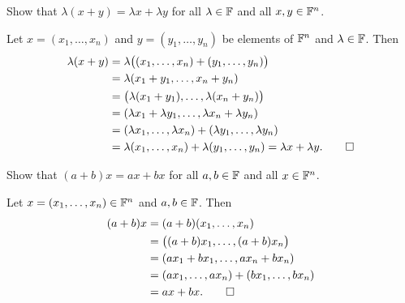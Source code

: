 \begin{exc}
\begin{exercise}
Show that $\lambda(x+y)=\lambda x+\lambda y$ for all $\lambda\in\mathbb{F}$ and all
$x,y\in\mathbb{F}^n$.
\end{exercise}
\begin{solution}
Let $x=(x_1,\dots,x_n)$ and $y=(y_1,\dots,y_n)$ be elements of $\mathbb{F}^n$ and
$\lambda\in\mathbb{F}$. Then
\begin{align*}
\lambda(x+y) &= \lambda\bigl((x_1,\dots,x_n)+(y_1,\dots,y_n)\bigr)\\
  &= \lambda(x_1+y_1,\dots,x_n+y_n)\\
  &= \bigl(\lambda(x_1+y_1),\dots,\lambda(x_n+y_n)\bigr)\\
  &= (\lambda x_1+\lambda y_1,\dots,\lambda x_n+\lambda y_n)\\
  &= (\lambda x_1,\dots,\lambda x_n)+(\lambda y_1,\dots,\lambda y_n)\\
  &= \lambda(x_1,\dots,x_n)+\lambda(y_1,\dots,y_n) = \lambda x+\lambda y. \qedhere
\end{align*}
\end{solution}

\begin{exercise}
Show that $(a+b)x=ax+bx$ for all $a,b\in\mathbb{F}$ and all $x\in\mathbb{F}^n$.
\end{exercise}
\begin{solution}
Let $x=(x_1,\dots,x_n)\in\mathbb{F}^n$ and $a,b\in\mathbb{F}$. Then
\begin{align*}
(a+b)x &= (a+b)(x_1,\dots,x_n)\\
       &= \bigl((a+b)x_1,\dots,(a+b)x_n\bigr)\\
       &= (ax_1+bx_1,\dots,ax_n+bx_n)\\
       &= (ax_1,\dots,ax_n)+(bx_1,\dots,bx_n)\\
       &= ax+bx. \qedhere
\end{align*}
\end{solution}
\end{exc}

